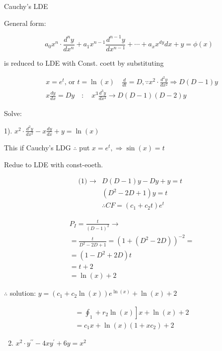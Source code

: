 \documentclass[12pt, a4paper]{article}
\begin{document}
Cauchy's LDE

General form:

$$
a_{0} x^{n} \cdot \frac{d^{n} y}{d x^{n}}+a_{1} x^{n-1} \frac{d^{n-1} y}{d x^{n-1}}+\cdots+a_{x} x^{d y} d x+y=\phi(x)
$$

is reduced to LDE with Const. coett by substituting

$$
\begin{aligned}
& x=e^{t} \text {, or } t=\ln (x) \quad \frac{d}{d t}=D, \because x^{2} \cdot \frac{d^{2} y}{d x^{2}} \Rightarrow D(D-1) y \\
& x \frac{d y}{d x}=D y \quad: \quad x^{3} \frac{d^{3} y}{d x^{3}} \rightarrow D(D-1)(D-2) y
\end{aligned}
$$

Solve:

1). $x^{2} \cdot \frac{d^{2} y}{d x^{2}}-x \frac{d y}{d x}+y=\ln (x)$

This if Cauchy's LDG $\therefore$ put $x=e^{t}, \Rightarrow \sin (x)=t$

Redue to LDE with const-eoeth.

$$
\begin{aligned}
\text { (1) } \rightarrow & D(D-1) y-D y+y=t \\
& \left(D^{2}-2 D+1\right) y=t \\
& \therefore C F=\left(c_{1}+c_{2} t\right) e^{t}
\end{aligned}
$$

$$
\begin{aligned}
& P_{I}=\frac{t}{(D-1)^{2}} \rightarrow \\
&= \frac{t}{D^{2}-2 D+1}=\left(1+\left(D^{2}-2 D\right)\right)^{-2}= \\
&=\left(1-D^{2}+2 D\right) t \\
&=t+2 \\
&=\ln (x)+2
\end{aligned}
$$

$\therefore$ solution: $y=\left(c_{1}+c_{2} \ln (x)\right) e^{\ln (x)}+\ln (x)+2$

$$
\begin{aligned}
& \left.=\oint_{1}+r_{2} \ln (x)\right] x+\ln (x)+2 \\
& =c_{1} x+\ln (x)\left(1+x c_{2}\right)+2
\end{aligned}
$$

\begin{enumerate}
  \setcounter{enumi}{1}
  \item $x^{2} \cdot y^{\prime \prime}-4 x y^{\prime}+6 y=x^{2}$
\end{enumerate}
\end{document}
